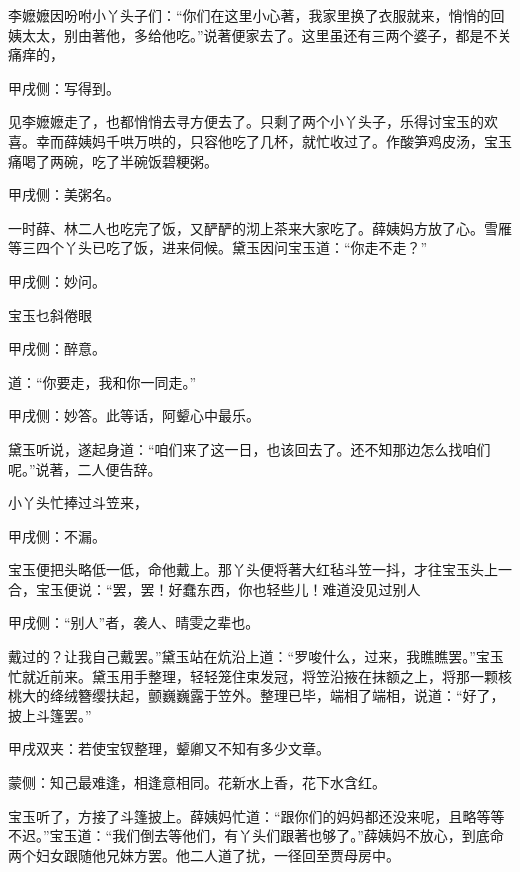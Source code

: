 \begin{parag}
    李嬷嬷因吩咐小丫头子们：“你们在这里小心著，我家里换了衣服就来，悄悄的回姨太太，别由著他，多给他吃。”说著便家去了。这里虽还有三两个婆子，都是不关痛痒的，\begin{note}甲戌侧：写得到。\end{note}见李嬷嬷走了，也都悄悄去寻方便去了。只剩了两个小丫头子，乐得讨宝玉的欢喜。幸而薛姨妈千哄万哄的，只容他吃了几杯，就忙收过了。作酸笋鸡皮汤，宝玉痛喝了两碗，吃了半碗饭碧粳粥。\begin{note}甲戌侧：美粥名。\end{note}一时薛、林二人也吃完了饭，又酽酽的沏上茶来大家吃了。薛姨妈方放了心。雪雁等三四个丫头已吃了饭，进来伺候。黛玉因问宝玉道：“你走不走？”\begin{note}甲戌侧：妙问。\end{note}宝玉乜斜倦眼\begin{note}甲戌侧：醉意。\end{note}道：“你要走，我和你一同走。”\begin{note}甲戌侧：妙答。此等话，阿颦心中最乐。\end{note}黛玉听说，遂起身道：“咱们来了这一日，也该回去了。还不知那边怎么找咱们呢。”说著，二人便告辞。
\end{parag}


\begin{parag}
    小丫头忙捧过斗笠来，\begin{note}甲戌侧：不漏。\end{note}宝玉便把头略低一低，命他戴上。那丫头便将著大红毡斗笠一抖，才往宝玉头上一合，宝玉便说：“罢，罢！好蠢东西，你也轻些儿！难道没见过别人\begin{note}甲戌侧：“别人”者，袭人、晴雯之辈也。\end{note}戴过的？让我自己戴罢。”黛玉站在炕沿上道：“罗唆什么，过来，我瞧瞧罢。”宝玉忙就近前来。黛玉用手整理，轻轻笼住束发冠，将笠沿掖在抹额之上，将那一颗核桃大的绛绒簪缨扶起，颤巍巍露于笠外。整理已毕，端相了端相，说道：“好了，披上斗篷罢。”\begin{note}甲戌双夹：若使宝钗整理，颦卿又不知有多少文章。\end{note}\begin{note}蒙侧：知己最难逢，相逢意相同。花新水上香，花下水含红。\end{note}宝玉听了，方接了斗篷披上。薛姨妈忙道：“跟你们的妈妈都还没来呢，且略等等不迟。”宝玉道：“我们倒去等他们，有丫头们跟著也够了。”薛姨妈不放心，到底命两个妇女跟随他兄妹方罢。他二人道了扰，一径回至贾母房中。
\end{parag}


